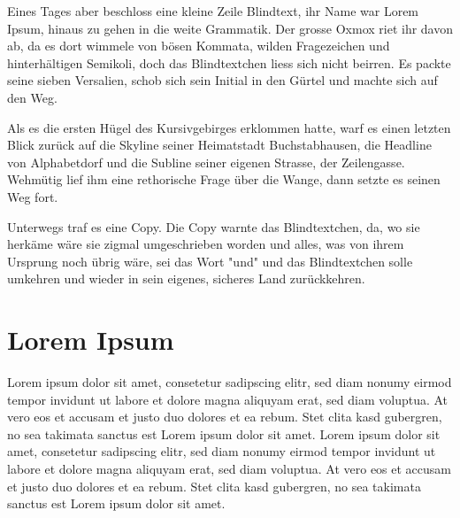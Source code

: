 Eines Tages aber beschloss eine kleine Zeile Blindtext, ihr Name war Lorem Ipsum, hinaus zu gehen in die weite Grammatik. Der grosse Oxmox riet ihr davon ab, da es dort wimmele von bösen Kommata, wilden Fragezeichen und hinterhältigen Semikoli, doch das Blindtextchen liess sich nicht beirren. Es packte seine sieben Versalien, schob sich sein Initial in den Gürtel und machte sich auf den Weg.

Als es die ersten Hügel des Kursivgebirges erklommen hatte, warf es einen letzten Blick zurück auf die Skyline seiner Heimatstadt Buchstabhausen, die Headline von Alphabetdorf und die Subline seiner eigenen Strasse, der Zeilengasse. Wehmütig lief ihm eine rethorische Frage über die Wange, dann setzte es seinen Weg fort.

Unterwegs traf es eine Copy. Die Copy warnte das Blindtextchen, da, wo sie herkäme wäre sie zigmal umgeschrieben worden und alles, was von ihrem Ursprung noch übrig wäre, sei das Wort "und" und das Blindtextchen solle umkehren und wieder in sein eigenes, sicheres Land zurückkehren.

\section{Lorem Ipsum}
\label{sec:lorem}
Lorem ipsum dolor sit amet, consetetur sadipscing elitr, sed diam nonumy eirmod tempor invidunt ut labore et dolore magna aliquyam erat, sed diam voluptua. At vero eos et accusam et justo duo dolores et ea rebum. Stet clita kasd gubergren, no sea takimata sanctus est Lorem ipsum dolor sit amet. Lorem ipsum dolor sit amet, consetetur sadipscing elitr, sed diam nonumy eirmod tempor invidunt ut labore et dolore magna aliquyam erat, sed diam voluptua. At vero eos et accusam et justo duo dolores et ea rebum. Stet clita kasd gubergren, no sea takimata sanctus est Lorem ipsum dolor sit amet.

